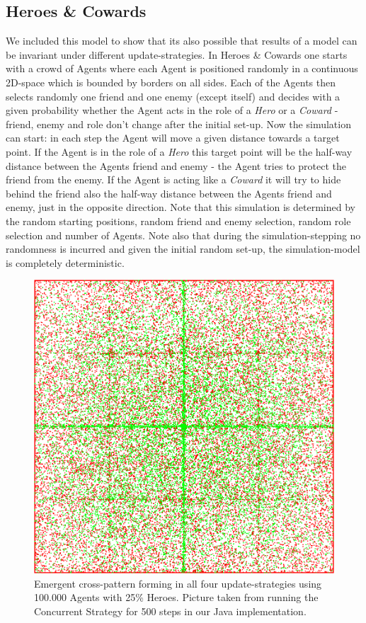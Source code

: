 \subsection{Heroes \& Cowards}
We included this model to show that its also possible that results of a model can be invariant under different update-strategies. In Heroes \& Cowards one starts with a crowd of Agents where each Agent is positioned randomly in a continuous 2D-space which is bounded by borders on all sides. Each of the Agents then selects randomly one friend and one enemy (except itself) and decides with a given probability whether the Agent acts in the role of a \textit{Hero} or a \textit{Coward} - friend, enemy and role don't change after the initial set-up. Now the simulation can start: in each step the Agent will move a given distance towards a target point. If the Agent is in the role of a \textit{Hero} this target point will be the half-way distance between the Agents friend and enemy - the Agent tries to protect the friend from the enemy. If the Agent is acting like a \textit{Coward} it will try to hide behind the friend also the half-way distance between the Agents friend and enemy, just in the opposite direction. Note that this simulation is determined by the random starting positions, random friend and enemy selection, random role selection and number of Agents. Note also that during the simulation-stepping no randomness is incurred and given the initial random set-up, the simulation-model is completely deterministic. \\

\begin{figure}
	\centering
  \includegraphics[width=.4\textwidth, angle=0]{./fig/con_HAC_100_000_500steps_haskell.png}
	\caption{Emergent cross-pattern forming in all four update-strategies using 100.000 Agents with 25\% Heroes. Picture taken from running the Concurrent Strategy for 500 steps in our Java implementation.}
	\label{fig:hac_strategies}
\end{figure}

